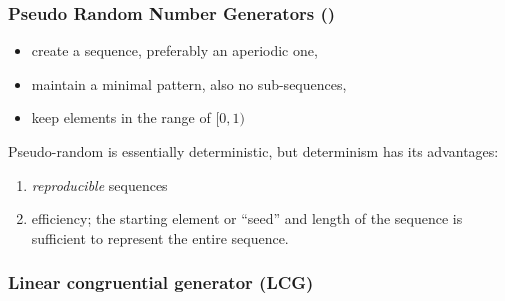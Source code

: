 
\begin{frame}\frametitle{\textbf{Pseudo} Random Number Generators (\subsecname)}


\begin{itemize}
\item create a sequence, preferably an aperiodic one,
\item maintain a minimal pattern, also no sub-sequences,
\item keep elements in the range of $\lbrack0, 1)$
\end{itemize}

\pause

\svspace{5mm}

Pseudo-random is essentially deterministic, but determinism has its advantages:
\begin{enumerate}
	\item \emph{reproducible} sequences
	\item efficiency; the starting element or ``seed'' and length of the sequence is sufficient to represent the entire sequence.
\end{enumerate}

\end{frame}

\subsubsection{Linear congruential generator (LCG)}

